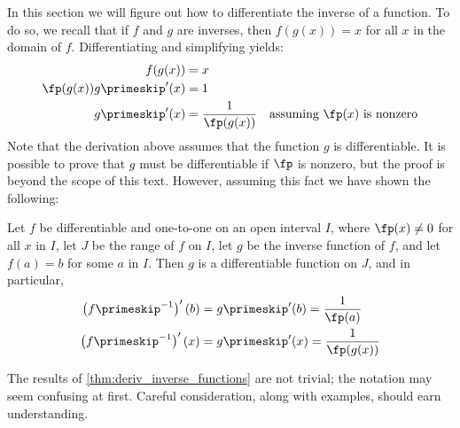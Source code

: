 %
%		

In this section we will figure out how to differentiate the inverse of a function. To do so, we recall that if $f$ and $g$ are inverses, then $f(g(x))=x$ for all $x$ in the domain of $f$. Differentiating and simplifying yields:
\begin{align*}
f(g(x))&=x\\
\fp(g(x))g\primeskip'(x)&=1\\
g\primeskip'(x)&=\frac 1{\fp(g(x))} \quad\text{assuming $\fp(x)$ is nonzero}
\end{align*}
Note that the derivation above assumes that the function $g$ is differentiable. It is possible to prove that $g$ must be differentiable if $\fp$ is nonzero, but the proof is beyond the scope of this text. However, assuming this fact we have shown the following:

{Let $f$ be differentiable and one-to-one on an open interval $I$, where $\fp(x) \neq 0$ for all $x$ in $I$, let $J$ be the range of $f$ on $I$, let $g$ be the inverse function of $f$, and let $f(a) = b$ for some $a$ in $I$. Then $g$ is a differentiable function on $J$, and in particular,
\begin{align*}
 \left(f\primeskip^{-1}\right)'(b) &=g\primeskip'(b) = \frac{1}{\fp(a)} \\
 \left(f\primeskip^{-1}\right)'(x) &=g\primeskip'(x) = \frac{1}{\fp(g(x))}
\end{align*}}

The results of \autoref{thm:deriv_inverse_functions} are not trivial; the notation may seem confusing at first. Careful consideration, along with examples, should earn understanding.

